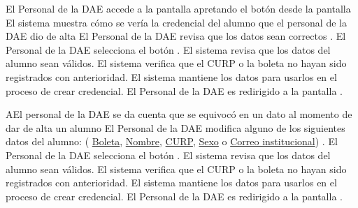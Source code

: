 \begin{UCtrayectoria}
    \UCpaso[\UCactor] El Personal de la DAE accede a la pantalla \label{CU22.introduceDatos} apretando el botón  desde la pantalla 
    \UCpaso El sistema muestra cómo se vería la credencial del alumno que el personal de la DAE dio de alta 
    \UCpaso[\UCactor] El Personal de la DAE revisa que los datos sean correctos .
    \UCpaso[\UCactor] El Personal de la DAE selecciona el botón .
    \UCpaso El sistema revisa que los datos del alumno sean válidos.
    \UCpaso El sistema verifica que el CURP o la boleta no hayan sido registrados con anterioridad.
    \UCpaso El sistema mantiene los datos para usarlos en el proceso de crear credencial.
\UCpaso[\UCactor] El Personal de la DAE es redirigido a la pantalla .
\end{UCtrayectoria}

\begin{UCtrayectoriaA}{A}{El personal de la DAE se da cuenta que se equivocó en un dato al momento de dar de alta un alumno }
    \UCpaso[\UCactor] El Personal de la DAE modifica alguno de los siguientes datos del alumno: ( \hyperlink{Alumno.Boleta}{Boleta}, \hyperlink{Alumno.Nombre}{Nombre}, \hyperlink{Alumno.CURP}{CURP}, \hyperlink{Alumno.Sexo}{Sexo} o \hyperlink{Alumno.Correo institucional}{Correo institucional}) .
    \UCpaso[\UCactor] El Personal de la DAE selecciona el botón .
    \UCpaso El sistema revisa que los datos del alumno sean válidos.
    \UCpaso El sistema verifica que el CURP o la boleta no hayan sido registrados con anterioridad.
    \UCpaso El sistema mantiene los datos para usarlos en el proceso de crear credencial.
    \UCpaso[\UCactor] El Personal de la DAE es redirigido a la pantalla .
\end{UCtrayectoriaA}


